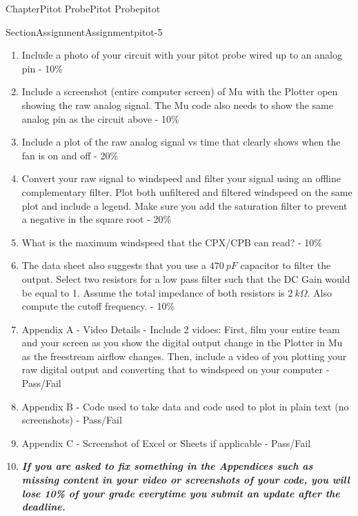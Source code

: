 \documentclass[oneside,10pt,]{book}
\newcommand{\alert}[1]{\textbf{\textit{#1}}}
\numberwithin{equation}{section}
\begin{document}
\begin{chapterptx}{Chapter}{Pitot Probe}{}{Pitot Probe}{}{}{pitot}
\begin{sectionptx}{Section}{Assignment}{}{Assignment}{}{}{pitot-5}
\begin{introduction}{}
\begin{enumerate}
\item{}Include a photo of your circuit with your pitot probe wired up to an analog pin - 10\%%
\item{}Include a screenshot (entire computer screen) of Mu with the Plotter open showing the raw analog signal. The Mu code also needs to show the same analog pin as the circuit above - 10\%%
\item{}Include a plot of the raw analog signal vs time that clearly shows when the fan is on and off - 20\%%
\item{}Convert your raw signal to windspeed and filter your signal using an offline complementary filter. Plot both unfiltered and filtered windspeed on the same plot and include a legend. Make sure you add the saturation filter to prevent a negative in the square root - 20\%%
\item{}What is the maximum windspeed that the CPX\slash{}CPB can read? - 10\%%
\item{}The data sheet also suggests that you use a \(470~pF\) capacitor to filter the output. Select two resistors for a low pass filter such that the DC Gain would be equal to 1. Assume the total impedance of both resistors is \(2~k\Omega\). Also compute the cutoff frequency. - 10\%%
\item{}Appendix A - Video Details - Include 2 vidoes: First, film your entire team and your screen as you show the digital output change in the Plotter in Mu as the freestream airflow changes. Then, include a video of you plotting your raw digital output and converting that to windspeed on your computer - Pass\slash{}Fail%
\item{}Appendix B - Code used to take data and code used to plot in plain text (no screenshots) - Pass\slash{}Fail%
\item{}Appendix C - Screenshot of Excel or Sheets if applicable - Pass\slash{}Fail%
\item{}\alert{If you are asked to fix something in the Appendices such as missing content in your video or screenshots of your code, you will lose 10\% of your grade everytime you submit an update after the deadline.}%
\end{enumerate}
\end{introduction}%
\end{sectionptx}
\end{chapterptx}
%
%
\typeout{************************************************}
\typeout{************************************************}
%
\end{document}
